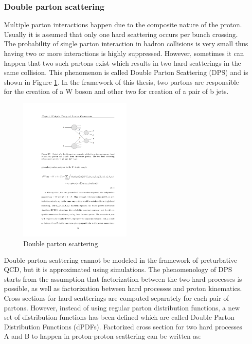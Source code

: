 \subsubsection{Double parton scattering}
\label{sec:DPS}

\par Multiple parton interactions happen due to the composite nature of the proton. Usually it is assumed that only one hard scattering occurs per bunch crossing. The probability of single parton interaction in hadron collisions is very small thus having two or more interactions is highly suppressed. However, sometimes it can happen that two such partons exist which results in two hard scatterings in the same collision. This phenomenon is called Double Parton Scattering (DPS) and is shown in Figure \ref{fig:DPS_diag}. In the framework of this thesis, two partons are responsible for the creation of a W boson and other two for creation of a pair of b jets. 
\begin{figure}[htbp]
	\centering
		\includegraphics[width=0.5\textwidth]{Figures/DPS_diag.pdf}
	\caption[Double parton scattering]{Double parton scattering}
	\label{fig:DPS_diag}
\end{figure}
\par Double parton scattering cannot be modeled in the framework of preturbative QCD, but it is approximated using simulations. The phenomenology of DPS starts from the assumption that factorization between the two hard processes is possible, as well as factorization between hard processes and proton kinematics. Cross sections for hard scatterings are computed separately for each pair of partons. However, instead of using regular parton distribution functions, a new set of distribution functions has been defined which are called Double Parton Distribution Functions (dPDFs). Factorized cross section for two hard processes A and B to happen in proton-proton scattering can be written as:
